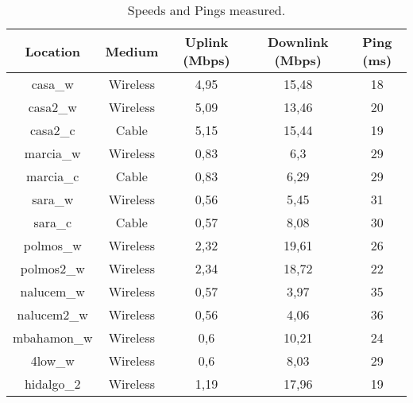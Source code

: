 \begin{table}[ht]
\caption[Speed Test: Speeds and Ping measured]{Speeds and Pings measured. }
\begin{center}
\begin{tabular}{|c||c|c|c|c|}
\hline
Location  & Medium  & Uplink (Mbps) & Downlink (Mbps) & Ping (ms)\\ \hline\hline
 casa\_w     & Wireless & 4,95           & 15,48         & 18 \\ \hline       %
 casa2\_w    & Wireless & 5,09           & 13,46         & 20 \\ \hline       %
 casa2\_c    & Cable    & 5,15           & 15,44         & 19 \\ \hline       %
 marcia\_w	& Wireless & 0,83	        &  6,3			& 29 \\ \hline
 marcia\_c	& Cable    & 0,83	        &  6,29	        & 29 \\ \hline
 sara\_w	    & Wireless & 0,56	        &  5,45	        & 31 \\ \hline
 sara\_c	    & Cable    & 0,57	        &  8,08	        & 30 \\ \hline
 polmos\_w   & Wireless & 2,32           & 19,61         & 26 \\ \hline       %
 polmos2\_w  & Wireless & 2,34           & 18,72         & 22 \\ \hline       %
 nalucem\_w  & Wireless & 0,57           & 3,97          & 35 \\ \hline       %
 nalucem2\_w & Wireless & 0,56           & 4,06          & 36 \\ \hline       %
 mbahamon\_w & Wireless & 0,6            & 10,21         & 24 \\ \hline       %
 4low\_w     & Wireless & 0,6            & 8,03          & 29 \\ \hline       %
 hidalgo\_2  & Wireless & 1,19           & 17,96         & 19 \\ \hline       %
\end{tabular}
\end{center}
\label{table:speeds}
\end{table}


